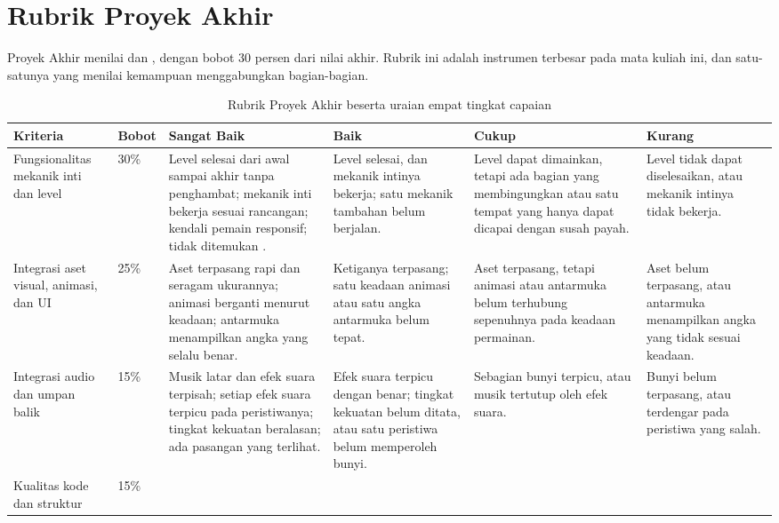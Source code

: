 \section{Rubrik Proyek Akhir}

Proyek Akhir menilai  dan , dengan bobot 30 persen dari nilai
akhir. Rubrik ini adalah instrumen terbesar pada mata kuliah ini, dan
satu-satunya yang menilai kemampuan menggabungkan bagian-bagian.

\begin{landscape}
\begin{table}[htbp]
\centering
\caption{Rubrik Proyek Akhir beserta uraian empat tingkat capaian}
\label{tab:rubrik-akhir-lengkap}
{\setlength{\tabcolsep}{4pt}\footnotesize%
\begin{tabularx}{\linewidth}{@{}L{2.8cm} C{1.3cm} Y Y Y Y@{}}
\toprule
\headrow \textbf{Kriteria} & \textbf{Bobot} & \textbf{Sangat Baik} & \textbf{Baik} & \textbf{Cukup} & \textbf{Kurang} \\
\midrule
Fungsionalitas mekanik inti dan level & 30\% &
Level selesai dari awal sampai akhir tanpa penghambat; mekanik inti bekerja
sesuai rancangan; kendali pemain responsif; tidak ditemukan
. &
Level selesai, dan mekanik intinya bekerja; satu mekanik tambahan belum
berjalan. &
Level dapat dimainkan, tetapi ada bagian yang membingungkan atau satu tempat
yang hanya dapat dicapai dengan susah payah. &
Level tidak dapat diselesaikan, atau mekanik intinya tidak bekerja. \\
\addlinespace
Integrasi aset visual, animasi, dan UI & 25\% &
Aset terpasang rapi dan seragam ukurannya; animasi berganti menurut keadaan;
antarmuka menampilkan angka yang selalu benar. &
Ketiganya terpasang; satu keadaan animasi atau satu angka antarmuka belum
tepat. &
Aset terpasang, tetapi animasi atau antarmuka belum terhubung sepenuhnya pada
keadaan permainan. &
Aset belum terpasang, atau antarmuka menampilkan angka yang tidak sesuai
keadaan. \\
\addlinespace
Integrasi audio dan umpan balik & 15\% &
Musik latar dan efek suara terpisah; setiap efek suara terpicu pada
peristiwanya; tingkat kekuatan beralasan; ada pasangan yang terlihat. &
Efek suara terpicu dengan benar; tingkat kekuatan belum ditata, atau satu
peristiwa belum memperoleh bunyi. &
Sebagian bunyi terpicu, atau musik tertutup oleh efek suara. &
Bunyi belum terpasang, atau terdengar pada peristiwa yang salah. \\
\addlinespace
Kualitas kode dan struktur  & 15\% &

\end{tabularx}}
\end{table}
\end{landscape}
